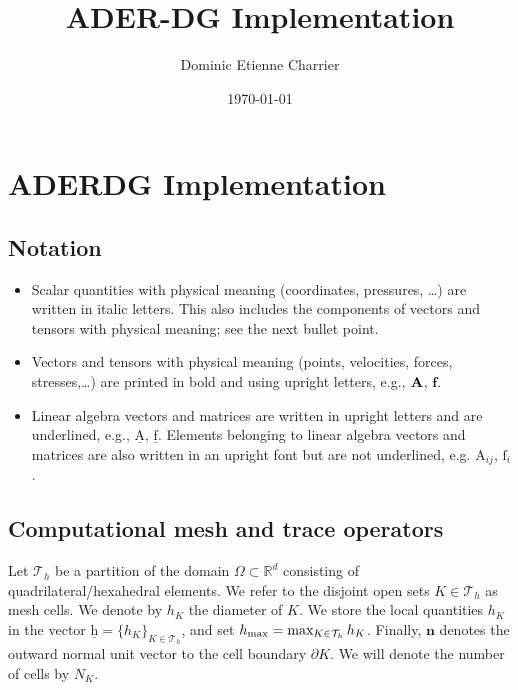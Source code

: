 \documentclass{scrreprt}
\newcommand{\partialup}{\partial}
\theoremstyle{definition}
\theoremstyle{nonumberplain}
\renewcommand{\vec}[1]{{\textbf{#1}}}
\newcommand{\mat}[1]{{\textbf #1}}
\newcommand{\laVec}[1]{\underline{\mathrm{#1}}}
\newcommand{\laVecel}[1]{\mathrm{#1}}
\newcommand{\laMat}[1]{\underline{\mathrm{#1}}}
\newcommand{\laMatel}[1]{\mathrm{#1}}
\newcommand{\domain}{\Omega}
\newcommand{\normal}{\vec{n}}
\newcommand{\tria}{\mathcal{T}_h}
\newcommand{\cell}{K}
\newcommand{\Ncell}{{N_{\cell}}}
\newcommand{\cellBnd}{{\partialup\cell}}
\newcommand{\hcell}{h_\cell}
\begin{document}
\title{ADER-DG Implementation}
\author{Dominic Etienne Charrier}
\date{\today}
\maketitle

\chapter{ADERDG Implementation}
\section{Notation}
\begin{itemize}
  \item Scalar quantities with physical meaning (coordinates, pressures, \ldots)
  are written in italic letters.
  This also includes the components of vectors and tensors with physical meaning;
  see the next bullet point.
  \item Vectors and tensors with physical meaning (points, velocities, forces,
  stresses,\ldots) are printed in bold and using upright letters, e.g.,
  $\mat{A}$, $\vec{f}$.
  \item Linear algebra vectors and matrices are written in upright letters
  and are underlined, e.g., $\laMat{A}$, $\laVec{f}$. Elements belonging to
  linear algebra vectors and matrices
  are also written in an upright font but are not underlined, e.g.
  $\laMatel{A}_{ij}$, $\laVecel{f}_i$.
\end{itemize}
\section{Computational mesh and trace operators}
\label{sec:mesh}
Let $\tria$ be a partition of the domain
$\domain\subset\mathbb{R}^d$ consisting of quadrilateral/hexahedral elements.
We refer to the disjoint open sets $\cell \in \tria$ as mesh cells. We denote by
$\hcell$ the diameter of $\cell$.
We store the local quantities $\hcell$ in the vector
$\laVec{h} = \{ \hcell \}_{\cell \in \tria}$, and
set
$h_\textup{max} = \text{max}_{\cell \in \tria }\,\hcell$.
Finally, $\normal$ denotes the outward normal unit vector to the cell boundary
$\cellBnd$. We will denote the number of cells by $\Ncell$.
\end{document}
